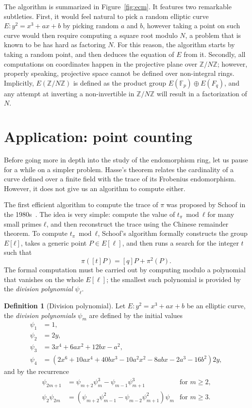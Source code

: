 \documentclass[10pt]{article}
\theoremstyle{plain}
\theoremstyle{definition}
\newtheorem{definition}[theorem]{Definition}
\def\F{\ensuremath{\mathbb{F}}}
\begin{document}
\begin{prposition}
The algorithm is summarized in Figure~\ref{fig:ecm}. %
It features two remarkable subtleties. %
First, it would feel natural to pick a random elliptic curve
$E:y^2=x^3+ax+b$ by picking random $a$ and $b$, however taking a point
on such curve would then require computing a square root modulo $N$, a
problem that is known to be has hard as factoring $N$. %
For this reason, the algorithm starts by taking a random point, and
then deduces the equation of $E$ from it. %
Secondly, all computations on coordinates happen in the projective
plane over $ℤ/Nℤ$; however, properly speaking, projective space cannot
be defined over non-integral rings. %
Implicitly, $E(ℤ/Nℤ)$ is defined as the product group
$E(\F_p)⊕E(F_q)$, and any attempt at inverting a non-invertible in
$ℤ/Nℤ$ will result in a factorization of $N$.


\section{Application: point counting}
\label{sec:appl-point-count}

Before going more in depth into the study of the endomorphism ring,
let us pause for a while on a simpler problem. %
Hasse's theorem relates the cardinality of a curve defined over a
finite field with the trace of its Frobenius endomorphism. %
However, it does not give us an algorithm to compute either.

The first efficient algorithm to compute the trace of $π$ was proposed
by Schoof in the 1980s~\cite{schoof85}. %
The idea is very simple: compute the value of $t_π\bmod ℓ$ for many
small primes $ℓ$, and then reconstruct the trace using the Chinese
remainder theorem. %
To compute $t_π\bmod ℓ$, Schoof's algorithm formally constructs the
group $E[ℓ]$, takes a generic point $P∈E[\ell]$, and then runs a
search for the integer $t$ such that
\[π([t]P) = [q]P + π^2(P).\] %
The formal computation must be carried out by computing modulo a
polynomial that vanishes on the whole $E[\ell]$; the smallest such
polynomial is provided by the \emph{division polynomial} $ψ_ℓ$.

\begin{definition}[Division polynomial]
  Let $E:y^2=x^3+ax+b$ be an elliptic curve, the \emph{division
    polynomials} $ψ_m$ are defined by the initial values
  \begin{align*}
    ψ_1 &= 1,\\
    ψ_2 &= 2y,\\
    ψ_3 &= 3x^4 + 6ax^2 + 12bx - a^2,\\
    ψ_4 &= (2x^6 + 10ax^4 + 40bx^3 - 10a^2x^2 - 8abx - 2a^3 - 16b^2)2y,
  \end{align*}
  and by the recurrence
  \begin{align*}
    ψ_{2m+1}  &= ψ_{m+2}ψ_m^3 - ψ_{m-1}ψ_{m+1}^3 &\text{for $m≥2$,}\\
    ψ_2ψ_{2m} &= (ψ_{m+2}ψ_{m-1}^2 - ψ_{m-2}ψ_{m+1}^2)ψ_m &\text{for $m≥3$.}
  \end{align*}


\end{definition}
\end{prposition}
\end{document}
